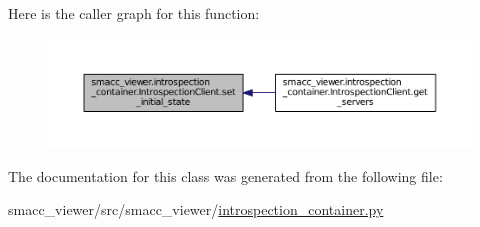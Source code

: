 Here is the caller graph for this function\+:
\nopagebreak
\begin{figure}[H]
\begin{center}
\leavevmode
\includegraphics[width=350pt]{classsmacc__viewer_1_1introspection__container_1_1IntrospectionClient_afc46c103e4237c9a4e14de8abaf4c152_icgraph}
\end{center}
\end{figure}




The documentation for this class was generated from the following file\+:\begin{DoxyCompactItemize}
\item 
smacc\+\_\+viewer/src/smacc\+\_\+viewer/\hyperlink{introspection__container_8py}{introspection\+\_\+container.\+py}\end{DoxyCompactItemize}
